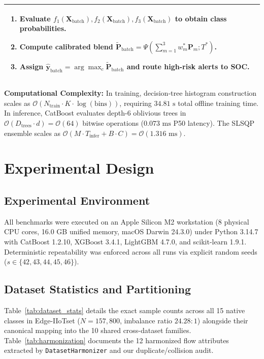 \documentclass[10pt,journal,twocolumn]{IEEEtran}
\begin{document}
\begin{table}[h]
\begin{tabular}{p{}}
\begin{enumerate}
    \item Evaluate $f_1(\mathbf{X}_{\text{batch}}), f_2(\mathbf{X}_{\text{batch}}), f_3(\mathbf{X}_{\text{batch}})$ to obtain class probabilities.
    \item Compute calibrated blend $\tilde{\mathbf{P}}_{\text{batch}} = \Psi(\sum_{m=1}^3 w_m^* \mathbf{P}_m; T^*)$.
    \item Assign $\hat{\mathbf{y}}_{\text{batch}} = \arg\max_c \tilde{\mathbf{P}}_{\text{batch}}$ and route high-risk alerts to SOC.
\end{enumerate}\\
\bottomrule
\end{tabular}
\end{table}

\textbf{Computational Complexity:} In training, decision-tree histogram construction scales as $\mathcal{O}(N_{\text{train}} \cdot K \cdot \log(\text{bins}))$, requiring $34.81\text{ s}$ total offline training time. In inference, CatBoost evaluates depth-$6$ oblivious trees in $\mathcal{O}(D_{\text{trees}} \cdot d) = \mathcal{O}(64)$ bitwise operations ($0.073\text{ ms}$ P50 latency). The SLSQP ensemble scales as $\mathcal{O}(M \cdot T_{\text{infer}} + B \cdot C) = \mathcal{O}(1.316\text{ ms})$.

\section{Experimental Design}

\subsection{Experimental Environment}
All benchmarks were executed on an Apple Silicon M2 workstation (8 physical CPU cores, 16.0 GB unified memory, macOS Darwin 24.3.0) under Python 3.14.7 with CatBoost 1.2.10, XGBoost 3.4.1, LightGBM 4.7.0, and scikit-learn 1.9.1. Deterministic repeatability was enforced across all runs via explicit random seeds ($s \in \{42, 43, 44, 45, 46\}$).

\subsection{Dataset Statistics and Partitioning}
Table~\ref{tab:dataset_stats} details the exact sample counts across all 15 native classes in Edge-IIoTset ($N=157,800$, imbalance ratio $24.28:1$) alongside their canonical mapping into the 10 shared cross-dataset families. Table~\ref{tab:harmonization} documents the 12 harmonized flow attributes extracted by \texttt{DatasetHarmonizer} and our duplicate/collision audit.
\end{document}
